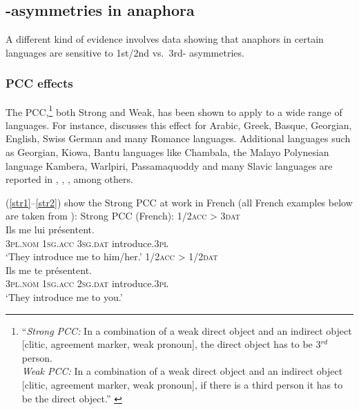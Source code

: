 \documentclass[output=paper, modfonts, nonflat]{langsci/langscibook}
\begin{document}
\subsection{\person-asymmetries in anaphora}

 A different kind of evidence involves data showing that anaphors in
 certain languages are sensitive to 1st/2nd vs.\ 3rd-\person{}
 asymmetries. 

\subsubsection{PCC effects}

The PCC,\footnote{``\textit{Strong PCC:} In a combination of a weak
  direct object and an indirect object [clitic, agreement marker, weak
  pronoun], the direct object has to be 3$^{rd}$ person.\\\textit{Weak
    PCC:} In a combination of a weak direct object and an indirect
  object [clitic, agreement marker, weak pronoun], if there is a third
  person it has to be the direct object.''  \citep[][182]{bonet:1991}}
both Strong and Weak, has been shown to apply to a wide
range of languages. For instance, \citet{bonet:1991} discusses this
effect for Arabic, Greek, Basque, Georgian, English, Swiss German and
many Romance languages. Additional languages such as Georgian, Kiowa,
Bantu languages like Chambala, the Malayo Polynesian language Kambera,
Warlpiri, Passamaquoddy and many Slavic languages are reported in
\citet{haspelmath:2004}, \citet{bejarrezac:2003}, \citet{doliana:2013}, among others.

(\ref{str1}--\ref{str2}) show the Strong PCC at work in
French %
(all French examples below are taken from
\citealt{raynaud:2017}):
\ea\label{fr} Strong PCC (French):
\ea\label{str1}   \textsc{1/2acc} >  \textsc{3dat}\\
\gll * Ils me lui pr\'esentent.\\
{} \textsc{3pl.nom} \textsc{1sg.acc} \textsc{3sg.dat} introduce.\textsc{3pl}\\
\glt `They introduce me to him/her.'
\ex\label{str2}   \textsc{1/2acc} >  \textsc{1/2dat}\\
\gll * Ils me te pr\'esentent.\\
{} \textsc{3pl.nom} \textsc{1sg.acc} \textsc{2sg.dat} introduce.\textsc{3pl}\\
\glt `They introduce me to you.'  \z \z
\end{document}
